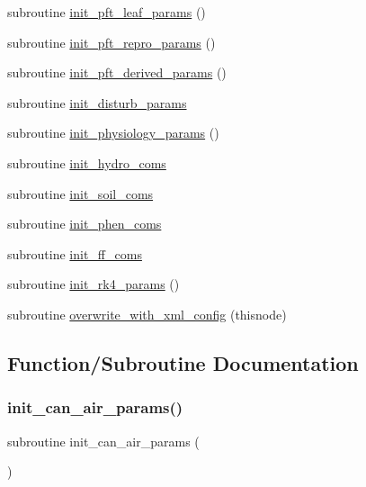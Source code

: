 \begin{DoxyCompactItemize}
\item 
subroutine \hyperlink{ed__params_8f90_a29b230a8d89c33fcad9397cb52370594}{init\+\_\+pft\+\_\+leaf\+\_\+params} ()
\item 
subroutine \hyperlink{ed__params_8f90_af887dfc134ede40b3777de2e5d21e053}{init\+\_\+pft\+\_\+repro\+\_\+params} ()
\item 
subroutine \hyperlink{ed__params_8f90_a21ff8ff0bd1d75c0aa63e325b69234c4}{init\+\_\+pft\+\_\+derived\+\_\+params} ()
\item 
subroutine \hyperlink{ed__params_8f90_aae6f522b02cc842e78d5635c1399601c}{init\+\_\+disturb\+\_\+params}
\item 
subroutine \hyperlink{ed__params_8f90_a143d565950a95de202237d4e388101c9}{init\+\_\+physiology\+\_\+params} ()
\item 
subroutine \hyperlink{ed__params_8f90_a388838ad10e11c3962aefd4118e3c16f}{init\+\_\+hydro\+\_\+coms}
\item 
subroutine \hyperlink{ed__params_8f90_a5cc44cea82dec9d24909807b46b4d165}{init\+\_\+soil\+\_\+coms}
\item 
subroutine \hyperlink{ed__params_8f90_a042d48afe0e36c29a7065500b43004b6}{init\+\_\+phen\+\_\+coms}
\item 
subroutine \hyperlink{ed__params_8f90_a606f81135d58d4f3fe3498b581ce7eea}{init\+\_\+ff\+\_\+coms}
\item 
subroutine \hyperlink{ed__params_8f90_a3ef1627f6aff0ad10ca705f74d615bf7}{init\+\_\+rk4\+\_\+params} ()
\item 
subroutine \hyperlink{ed__params_8f90_a2c0c887700d85a5be6fbd26b071c8da6}{overwrite\+\_\+with\+\_\+xml\+\_\+config} (thisnode)
\end{DoxyCompactItemize}


\subsection{Function/\+Subroutine Documentation}
\mbox{\label{ed__params_8f90_a029548f8d070ed57f9c9b1e1a0a8fc3c}} 
\subsubsection{\texorpdfstring{init\+\_\+can\+\_\+air\+\_\+params()}{init\_can\_air\_params()}}
{\footnotesize\ttfamily subroutine init\+\_\+can\+\_\+air\+\_\+params (\begin{DoxyParamCaption}{ }\end{DoxyParamCaption})}

